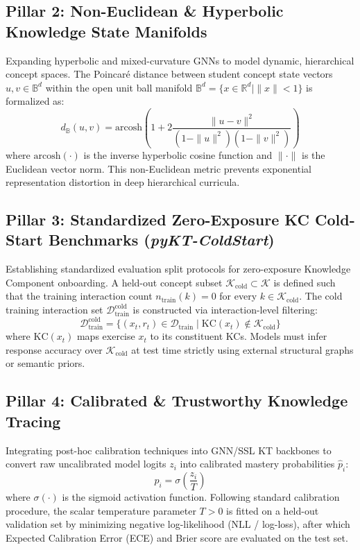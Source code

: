\documentclass[journal]{IEEEtran}
\begin{document}
\subsection{Pillar 2: Non-Euclidean \& Hyperbolic Knowledge State Manifolds}
Expanding hyperbolic and mixed-curvature GNNs to model dynamic, hierarchical concept spaces. The Poincaré distance between student concept state vectors $u, v \in \mathbb{B}^d$ within the open unit ball manifold $\mathbb{B}^d = \{x \in \mathbb{R}^d \mid \|x\| < 1\}$ is formalized as:
\begin{equation}
d_{\mathbb{B}}(u, v) = \text{arcosh}\left(1 + 2 \frac{\|u - v\|^2}{(1 - \|u\|^2)(1 - \|v\|^2)}\right)
\end{equation}
where $\text{arcosh}(\cdot)$ is the inverse hyperbolic cosine function and $\|\cdot\|$ is the Euclidean vector norm. This non-Euclidean metric prevents exponential representation distortion in deep hierarchical curricula.

\subsection{Pillar 3: Standardized Zero-Exposure KC Cold-Start Benchmarks (\emph{pyKT-ColdStart})}
Establishing standardized evaluation split protocols for zero-exposure Knowledge Component onboarding. A held-out concept subset $\mathcal{K}_{\text{cold}} \subset \mathcal{K}$ is defined such that the training interaction count $n_{\text{train}}(k) = 0$ for every $k \in \mathcal{K}_{\text{cold}}$. The cold training interaction set $\mathcal{D}_{\text{train}}^{\text{cold}}$ is constructed via interaction-level filtering:
\begin{equation}
\mathcal{D}_{\text{train}}^{\text{cold}} = \{(x_t, r_t) \in \mathcal{D}_{\text{train}} \mid \text{KC}(x_t) \notin \mathcal{K}_{\text{cold}}\}
\end{equation}
where $\text{KC}(x_t)$ maps exercise $x_t$ to its constituent KCs. Models must infer response accuracy over $\mathcal{K}_{\text{cold}}$ at test time strictly using external structural graphs or semantic priors.

\subsection{Pillar 4: Calibrated \& Trustworthy Knowledge Tracing}
Integrating post-hoc calibration techniques into GNN/SSL KT backbones to convert raw uncalibrated model logits $z_i$ into calibrated mastery probabilities $\hat{p}_i$:
\begin{equation}
\hat{p}_i = \sigma\left(\frac{z_i}{T}\right)
\end{equation}
where $\sigma(\cdot)$ is the sigmoid activation function. Following standard calibration procedure, the scalar temperature parameter $T > 0$ is fitted on a held-out validation set by minimizing negative log-likelihood (NLL / log-loss), after which Expected Calibration Error (ECE) and Brier score are evaluated on the test set.
\end{document}
